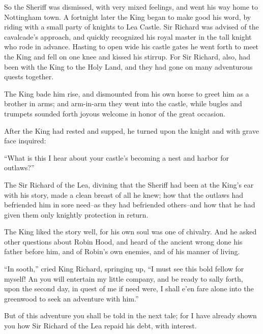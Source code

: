 So the Sheriff was dismissed, with very mixed feelings, and went his way
home to Nottingham town. A fortnight later the King began to make good
his word, by riding with a small party of knights to Lea Castle. Sir
Richard was advised of the cavalcade's approach, and quickly recognized
his royal master in the tall knight who rode in advance. Hasting to open
wide his castle gates he went forth to meet the King and fell on one
knee and kissed his stirrup. For Sir Richard, also, had been with the
King to the Holy Land, and they had gone on many adventurous quests
together.

The King bade him rise, and dismounted from his own horse to greet him
as a brother in arms; and arm-in-arm they went into the castle, while
bugles and trumpets sounded forth joyous welcome in honor of the great
occasion.

After the King had rested and supped, he turned upon the knight and with
grave face inquired:

``What is this I hear about your castle's becoming a nest and harbor for
outlaws?''

The Sir Richard of the Lea, divining that the Sheriff had been at the
King's ear with his story, made a clean breast of all he knew; how that
the outlaws had befriended him in sore need--as they had befriended
others--and how that he had given them only knightly protection in
return.

The King liked the story well, for his own soul was one of chivalry. And
he asked other questions about Robin Hood, and heard of the ancient
wrong done his father before him, and of Robin's own enemies, and of his
manner of living.

``In sooth,'' cried King Richard, springing up, ``I must see this bold
fellow for myself! An you will entertain my little company, and be ready
to sally forth, upon the second day, in quest of me if need were, I
shall e'en fare alone into the greenwood to seek an adventure with
him.''

But of this adventure you shall be told in the next tale; for I have
already shown you how Sir Richard of the Lea repaid his debt, with
interest.
